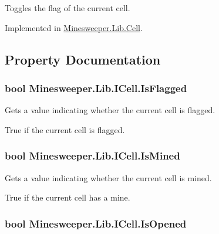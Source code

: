 Toggles the flag of the current cell. 



Implemented in \hyperlink{class_minesweeper_1_1_lib_1_1_cell_a0f959eea2ba69dfa8fcb0ee72e8b33ca}{Minesweeper.\+Lib.\+Cell}.



\subsection{Property Documentation}
\hypertarget{interface_minesweeper_1_1_lib_1_1_i_cell_ad854c4d0c51388abb1b11634184ba361}{
\subsubsection[{Is\+Flagged}]{\setlength{\rightskip}{0pt plus 5cm}bool Minesweeper.\+Lib.\+I\+Cell.\+Is\+Flagged\hspace{0.3cm}{\ttfamily [get]}}}\label{interface_minesweeper_1_1_lib_1_1_i_cell_ad854c4d0c51388abb1b11634184ba361}


Gets a value indicating whether the current cell is flagged. 

True if the current cell is flagged.\hypertarget{interface_minesweeper_1_1_lib_1_1_i_cell_a4bd673766caa3ba4975bcbdc092c61c6}{
\subsubsection[{Is\+Mined}]{\setlength{\rightskip}{0pt plus 5cm}bool Minesweeper.\+Lib.\+I\+Cell.\+Is\+Mined\hspace{0.3cm}{\ttfamily [get]}}}\label{interface_minesweeper_1_1_lib_1_1_i_cell_a4bd673766caa3ba4975bcbdc092c61c6}


Gets a value indicating whether the current cell is mined. 

True if the current cell has a mine.\hypertarget{interface_minesweeper_1_1_lib_1_1_i_cell_a02ffb839dc8dc60f261628916e2ac62a}{
\subsubsection[{Is\+Opened}]{\setlength{\rightskip}{0pt plus 5cm}bool Minesweeper.\+Lib.\+I\+Cell.\+Is\+Opened\hspace{0.3cm}{\ttfamily [get]}}}\label{interface_minesweeper_1_1_lib_1_1_i_cell_a02ffb839dc8dc60f261628916e2ac62a}


